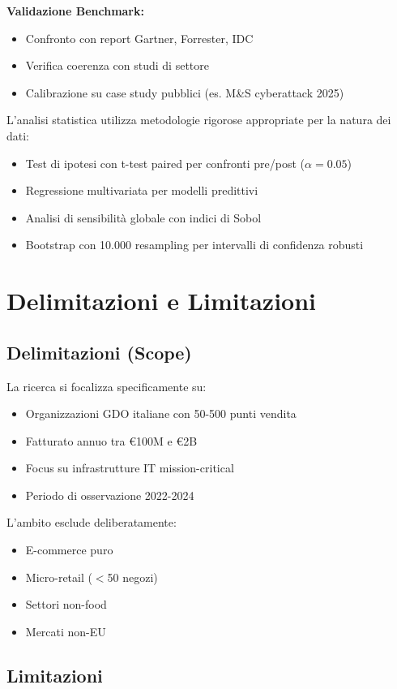 \textbf{Validazione Benchmark:}
\begin{itemize}
\item Confronto con report Gartner, Forrester, IDC
\item Verifica coerenza con studi di settore
\item Calibrazione su case study pubblici (es. M\&S cyberattack 2025)
\end{itemize}

L'analisi statistica utilizza metodologie rigorose appropriate per la natura dei dati:
\begin{itemize}
\item Test di ipotesi con t-test paired per confronti pre/post ($\alpha = 0.05$)
\item Regressione multivariata per modelli predittivi
\item Analisi di sensibilità globale con indici di Sobol
\item Bootstrap con 10.000 resampling per intervalli di confidenza robusti
\end{itemize}

\section{Delimitazioni e Limitazioni}

\subsection{Delimitazioni (Scope)}

La ricerca si focalizza specificamente su:
\begin{itemize}
\item Organizzazioni GDO italiane con 50-500 punti vendita
\item Fatturato annuo tra €100M e €2B
\item Focus su infrastrutture IT mission-critical
\item Periodo di osservazione 2022-2024
\end{itemize}

L'ambito esclude deliberatamente:
\begin{itemize}
\item E-commerce puro
\item Micro-retail ($<$50 negozi)
\item Settori non-food
\item Mercati non-EU
\end{itemize}

\subsection{Limitazioni}

